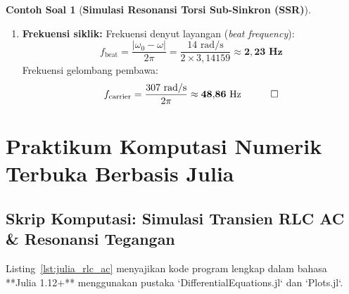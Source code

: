 \documentclass[11pt,a4paper]{article}
\theoremstyle{definition}
\newtheorem{example}{Contoh Soal}[section]
\begin{document}
\begin{example}[\textbf{Simulasi Resonansi Torsi Sub-Sinkron (SSR)}]
\begin{enumerate}[label=(\alph*), leftmargin=*]
    \item \textbf{Frekuensi siklik:}
    Frekuensi denyut layangan (\textit{beat frequency}):
    \begin{equation*}
        f_{\text{beat}} = \frac{|\omega_0 - \omega|}{2\pi} = \frac{14\text{ rad/s}}{2 \times 3{,}14159} \approx \mathbf{2{,}23\text{ Hz}}
    \end{equation*}
    Frekuensi gelombang pembawa:
    \begin{equation*}
        f_{\text{carrier}} = \frac{307\text{ rad/s}}{2\pi} \approx \mathbf{48{,}86\text{ Hz}} \quad \qed
    \end{equation*}
\end{enumerate}
\end{example}

\section{Praktikum Komputasi Numerik Terbuka Berbasis Julia}

\subsection{Skrip Komputasi: Simulasi Transien RLC AC \& Resonansi Tegangan}

Listing~\ref{lst:julia_rlc_ac} menyajikan kode program lengkap dalam bahasa **Julia 1.12+** menggunakan pustaka `DifferentialEquations.jl` dan `Plots.jl`.
\end{document}
